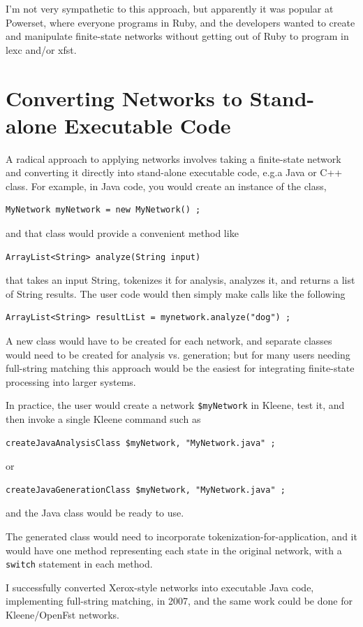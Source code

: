 \documentclass[letterpaper,12pt]{article}
\begin{document}
I'm not very sympathetic to this approach, but apparently it was
popular at Powerset, where everyone programs in Ruby, and the
developers wanted to create and manipulate finite-state networks
without getting out of Ruby to program in lexc and/or xfst.

\section{Converting Networks to Stand-alone Executable Code}

A radical approach to applying networks involves taking a finite-state network
and converting it directly into stand-alone 
executable code, e.g.\@ a Java or C++ class.  For
example, in Java code, you would create an instance of the class, 

\begin{Verbatim}[fontsize=\small]
    MyNetwork myNetwork = new MyNetwork() ;
\end{Verbatim}

\noindent
and that class would provide a convenient method like

\begin{Verbatim}[fontsize=\small]
    ArrayList<String> analyze(String input)
\end{Verbatim}

\noindent
that takes an input String, tokenizes it for analysis, analyzes it, and
returns
a list of String results.  The user code would then simply make calls like
the following

\begin{Verbatim}[fontsize=\small]
    ArrayList<String> resultList = mynetwork.analyze("dog") ;
\end{Verbatim}


A new class would have to be created for each
network, and separate classes would need to be created for analysis vs.\@
generation; but for many users needing full-string matching this approach
would be the easiest for integrating finite-state processing into larger
systems.

In practice, the user would create a network \verb!$myNetwork! in Kleene, test it, and then
invoke a single Kleene command such as

\begin{Verbatim}[fontsize=\small]
createJavaAnalysisClass $myNetwork, "MyNetwork.java" ;
\end{Verbatim}

\noindent
or
\begin{Verbatim}[fontsize=\small]
createJavaGenerationClass $myNetwork, "MyNetwork.java" ;
\end{Verbatim}

\noindent
and the Java class would be ready to use.

The generated class would need to incorporate tokenization-for-application,
and it would have one method representing each state in the original
network, with a \texttt{switch} statement in each method.  

I successfully converted Xerox-style networks into executable Java
code, implementing full-string matching, in 2007, and the same work could be done for Kleene/OpenFst networks.
\end{document}
